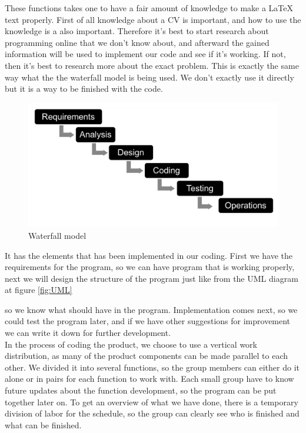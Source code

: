 These functions takes one to have a fair amount of knowledge to make a LaTeX text properly.
First of all knowledge about a CV is important, and how to use the knowledge is a also important.
Therefore it's best to start research about programming online that we don't know about, 
and afterward the gained information will be used to implement our code and see if it's working. 
If not, then it's best to research more about the exact problem.
This is exactly the same way what the the waterfall model is being used.
We don't exactly use it directly but it is a way to be finished with the code.
\begin{figure}[H]
  \centering
  \includegraphics[scale = 0.2]{figures/vandfald}
  \caption{Waterfall model \cite{Waterfall_model}}
\end{figure}

It has the elements that has been implemented in our coding. First we have the requirements for the program, 
so we can have program that is working properly, 
next we will design the structure of the program just like from the UML diagram at figure \vref{fig:UML}
 
so we know what should have in the program. Implementation comes next, so we could test the program later, 
and if we have other suggestions for improvement we can write it down for further development.\\

In the process of coding the product, we choose to use a vertical work distribution, as many of the product
components can be made parallel to each other. We divided it into several functions, 
so the group members can either do it alone or in pairs for each function to work with.
Each small group have to know future updates about the function development, so the program can be put together later on.
To get an overview of what we have done, there is a temporary division of labor for the schedule, 
so the group can clearly see who is finished and what can be finished. \\

